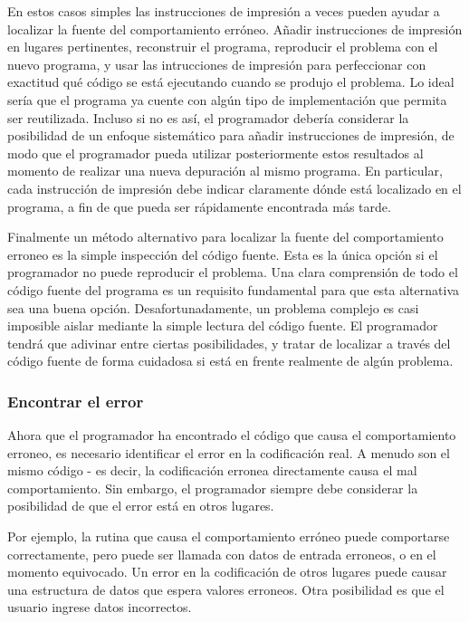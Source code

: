 \documentclass[12pt,legalpaper]{report}
\begin{document}
En estos casos simples las instrucciones de impresión a veces pueden ayudar a localizar la fuente del comportamiento erróneo. Añadir instrucciones de impresión en lugares pertinentes, reconstruir el programa, reproducir el problema con el nuevo programa, y usar las intrucciones de impresión para perfeccionar con exactitud qué código se está ejecutando cuando se produjo el problema.  Lo ideal sería que el programa ya cuente con algún tipo de implementación que permita ser reutilizada. Incluso si no es así, el programador debería considerar la posibilidad de un enfoque sistemático para añadir instrucciones de impresión, de modo que el programador pueda utilizar posteriormente estos resultados al momento de realizar una nueva depuración al mismo programa. En particular, cada instrucción de impresión debe indicar claramente dónde está localizado en el programa, a fin de que pueda ser rápidamente encontrada más tarde.

Finalmente un método alternativo para localizar la fuente del comportamiento erroneo es la simple inspección del código fuente. Esta es la única opción si el programador no puede reproducir el problema. Una clara comprensión de todo el código fuente del programa es un requisito fundamental para que esta alternativa sea una buena opción. Desafortunadamente, un problema complejo es casi imposible aislar mediante la simple lectura del código fuente.  El programador tendrá que adivinar entre ciertas posibilidades, y tratar de localizar a través del código fuente de forma cuidadosa si está en frente realmente de algún problema.


\subsubsection{Encontrar el error}

Ahora que el programador ha encontrado el código que causa el comportamiento erroneo, es necesario identificar el error en la codificación real. A menudo son el mismo código - es decir, la codificación erronea directamente causa el mal comportamiento. Sin embargo, el programador siempre debe considerar la posibilidad de que el error está en otros lugares.

Por ejemplo, la rutina que causa el comportamiento erróneo puede comportarse correctamente, pero puede ser llamada con datos de entrada erroneos, o en el momento equivocado. Un error en la codificación de otros lugares puede causar una estructura de datos que espera valores erroneos. Otra posibilidad es que el usuario ingrese datos incorrectos.
\end{document}
